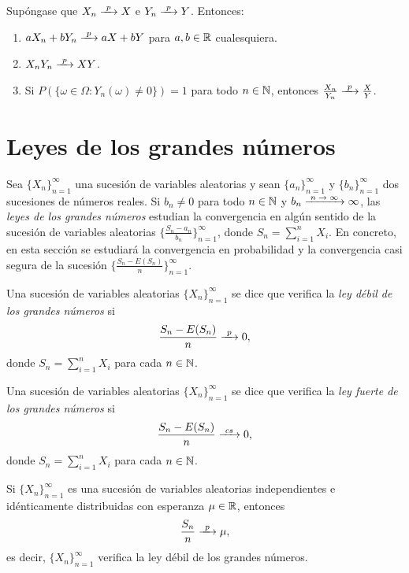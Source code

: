 \documentclass[a4paper, 11pt, extrafontsizes]{memoir}
\begin{document}
\begin{corollary}
    Supóngase que $X_n \pconv X$ e $Y_n \pconv Y$. Entonces:
    \begin{enumerate}
        \item $aX_n + bY_n \pconv aX+bY$ para $a,b \in \mathbb R$ cualesquiera.
        \item $X_nY_n \pconv XY$.
        \item Si $P(\{\omega \in \Omega \colon Y_n(\omega) \neq 0\}) = 1$ para todo $n \in \mathbb N$, entonces $\frac{X_n}{Y_n} \pconv \frac{X}{Y}$.
    \end{enumerate}
\end{corollary}

\section{Leyes de los grandes números}

Sea $\{X_n\}_{n=1}^\infty$ una sucesión de variables aleatorias y sean $\{a_n\}_{n=1}^\infty$ y $\{b_n\}_{n=1}^\infty$ dos sucesiones de números reales. Si $b_n \neq 0$ para todo $n \in \mathbb N$ y $b_n \nconv \infty$, las \emph{leyes de los grandes números} estudian la convergencia en algún sentido de la sucesión de variables aleatorias $\{\frac{S_n-a_n}{b_n}\}_{n=1}^\infty$, donde $S_n = \sum_{i=1}^n X_i$. En concreto, en esta sección se estudiará la convergencia en probabilidad y la convergencia casi segura de la sucesión $\{\frac{S_n-E(S_n)}{n}\}_{n=1}^\infty$.

\begin{definition}
    Una sucesión de variables aleatorias $\{X_n\}_{n=1}^\infty$ se dice que verifica la \emph{ley débil de los grandes números} si
    \[\frac{S_n-E(S_n)}{n} \pconv 0,\]
    donde $S_n = \sum_{i=1}^n X_i$ para cada $n \in \mathbb N$.
\end{definition}

\begin{definition}
    Una sucesión de variables aleatorias $\{X_n\}_{n=1}^\infty$ se dice que verifica la \emph{ley fuerte de los grandes números} si
    \[\frac{S_n-E(S_n)}{n} \csconv 0,\]
    donde $S_n = \sum_{i=1}^n X_i$ para cada $n \in \mathbb N$.
\end{definition}

\begin{theorem}
    Si $\{X_n\}_{n=1}^\infty$ es una sucesión de variables aleatorias independientes e idénticamente distribuidas con esperanza $\mu \in \mathbb R$, entonces
    \[\frac{S_n}{n} \pconv \mu,\]
    es decir, $\{X_n\}_{n=1}^\infty$ verifica la ley débil de los grandes números.
\end{theorem}
\end{document}
